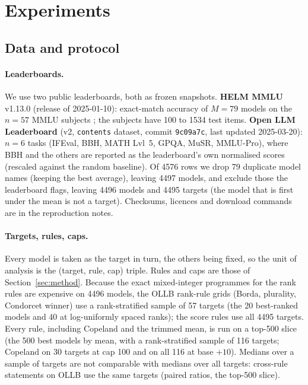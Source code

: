 \section{Experiments}
\label{sec:experiments}

\subsection{Data and protocol}
\label{sec:protocol}
\paragraph{Leaderboards.}
We use two public leaderboards, both as frozen snapshots. \textbf{HELM MMLU} v1.13.0 (release of 2025-01-10): exact-match accuracy of $M=79$ models on the $n=57$ MMLU subjects \citep{hendrycks2020mmlu,liang2022holistic}; the subjects have 100 to 1534 test items. \textbf{Open LLM Leaderboard} (v2, \texttt{contents} dataset, commit \texttt{9c09a7c}, last updated 2025-03-20): $n=6$ tasks (IFEval, BBH, MATH Lvl~5, GPQA, MuSR, MMLU-Pro), where BBH \citep{suzgun2022bbh} and the others are reported as the leaderboard's own normalised scores (rescaled against the random baseline). Of 4576 rows we drop 79 duplicate model names (keeping the best average), leaving 4497 models, and exclude those the leaderboard flags, leaving 4496 models and 4495 targets (the model that is first under the mean is not a target). Checksums, licences and download commands are in the reproduction notes.

\paragraph{Targets, rules, caps.}
Every model is taken as the target in turn, the others being fixed, so the unit of analysis is the (target, rule, cap) triple. Rules and caps are those of Section~\ref{sec:method}. Because the exact mixed-integer programmes for the rank rules are expensive on 4496 models, the OLLB rank-rule grids (Borda, plurality, Condorcet winner) use a rank-stratified sample of 57 targets (the 20 best-ranked models and 40 at log-uniformly spaced ranks); the score rules use all 4495 targets. Every rule, including Copeland and the trimmed mean, is run on a top-500 slice (the 500 best models by mean, with a rank-stratified sample of 116 targets; Copeland on 30 targets at cap 100 and on all 116 at base $+10$). Medians over a sample of targets are not comparable with medians over all targets: cross-rule statements on OLLB use the same targets (paired ratios, the top-500 slice).

